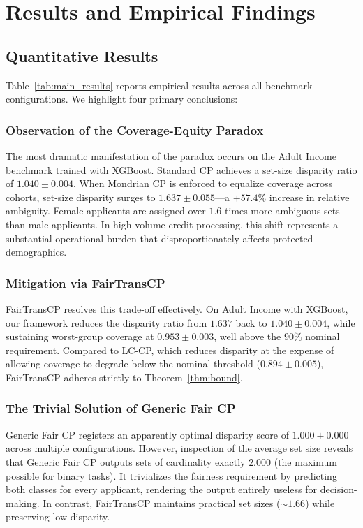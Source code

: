 \documentclass[conference]{IEEEtran}
\begin{document}
\section{Results and Empirical Findings}

\subsection{Quantitative Results}
Table~\ref{tab:main_results} reports empirical results across all benchmark configurations. We highlight four primary conclusions:

\subsubsection{Observation of the Coverage-Equity Paradox}
The most dramatic manifestation of the paradox occurs on the Adult Income benchmark trained with XGBoost. Standard CP achieves a set-size disparity ratio of $1.040 \pm 0.004$. When Mondrian CP is enforced to equalize coverage across cohorts, set-size disparity surges to $\mathbf{1.637 \pm 0.055}$—a $\mathbf{+57.4\%}$ increase in relative ambiguity. Female applicants are assigned over $1.6$ times more ambiguous sets than male applicants. In high-volume credit processing, this shift represents a substantial operational burden that disproportionately affects protected demographics.

\subsubsection{Mitigation via FairTransCP}
FairTransCP resolves this trade-off effectively. On Adult Income with XGBoost, our framework reduces the disparity ratio from $1.637$ back to $\mathbf{1.040 \pm 0.004}$, while sustaining worst-group coverage at $0.953 \pm 0.003$, well above the $90\%$ nominal requirement. Compared to LC-CP, which reduces disparity at the expense of allowing coverage to degrade below the nominal threshold ($0.894 \pm 0.005$), FairTransCP adheres strictly to Theorem~\ref{thm:bound}.

\subsubsection{The Trivial Solution of Generic Fair CP}
Generic Fair CP registers an apparently optimal disparity score of $1.000 \pm 0.000$ across multiple configurations. However, inspection of the average set size reveals that Generic Fair CP outputs sets of cardinality exactly $2.000$ (the maximum possible for binary tasks). It trivializes the fairness requirement by predicting both classes for every applicant, rendering the output entirely useless for decision-making. In contrast, FairTransCP maintains practical set sizes ($\sim 1.66$) while preserving low disparity.
\end{document}
